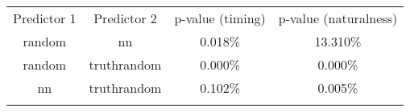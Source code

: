 \begin{tabular}{cccc}
\hline\noalign{\smallskip}
Predictor 1 & Predictor 2 & p-value (timing) & p-value (naturalness) \\
\noalign{\smallskip}\svhline\noalign{\smallskip}
random & nn & 0.018\% & 13.310\% \\
random & truthrandom & 0.000\% & 0.000\% \\
nn & truthrandom & 0.102\% & 0.005\% \\
\noalign{\smallskip}\hline\noalign{\smallskip}
\end{tabular}
